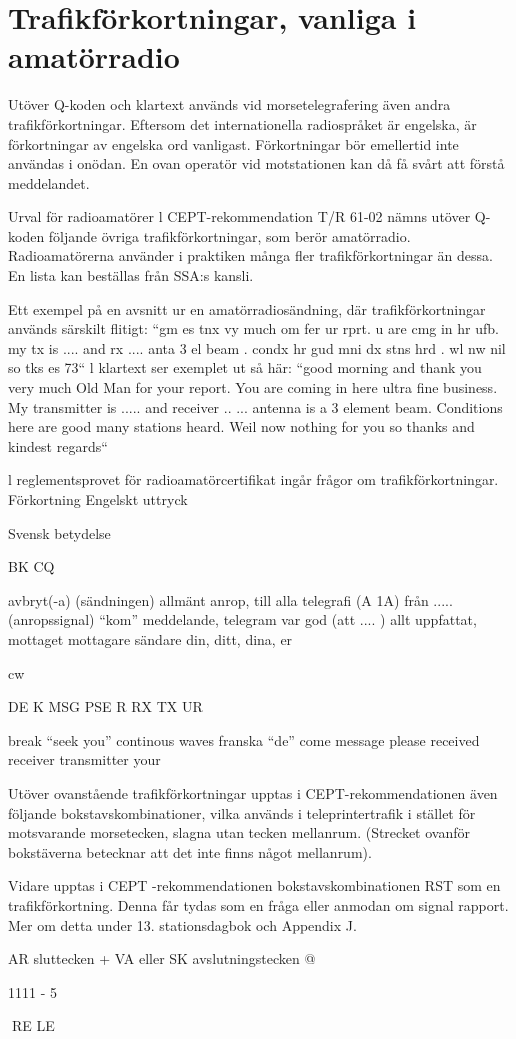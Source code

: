 \section{Trafikförkortningar, vanliga i amatörradio}
Utöver Q-koden och klartext används vid
morsetelegrafering även andra trafikförkortningar. Eftersom det internationella radiospråket är engelska, är förkortningar av engelska ord vanligast.
Förkortningar bör emellertid inte användas i onödan. En ovan operatör vid motstationen kan då få svårt att förstå meddelandet.

Urval för radioamatörer
l CEPT-rekommendation T/R 61-02 nämns
utöver Q-koden följande övriga trafikförkortningar, som berör amatörradio.
Radioamatörerna använder i praktiken
många fler trafikförkortningar än dessa. En
lista kan beställas från SSA:s kansli.

Ett exempel på en avsnitt ur en amatörradiosändning, där trafikförkortningar används
särskilt flitigt:
``gm es tnx vy much om fer ur rprt. u are
cmg in hr ufb. my tx is .... and rx .... anta 3
el beam . condx hr gud mni dx stns hrd . wl
nw nil so tks es 73``
l klartext ser exemplet ut så här:
``good morning and thank you very much
Old Man for your report. You are coming in
here ultra fine business. My transmitter is .....
and receiver .. ... antenna is a 3 element
beam. Conditions here are good many
stations heard. Weil now nothing for you so
thanks and kindest regards``

l reglementsprovet för radioamatörcertifikat ingår frågor om trafikförkortningar.
Förkortning Engelskt uttryck

Svensk betydelse

BK
CQ

avbryt(-a) (sändningen)
allmänt anrop, till alla
telegrafi (A 1A)
från ..... (anropssignal)
``kom''
meddelande, telegram
var god (att .... )
allt uppfattat, mottaget
mottagare
sändare
din, ditt, dina, er

cw

DE
K
MSG
PSE
R
RX
TX
UR

break
``seek you''
continous waves
franska ``de''
come
message
please
received
receiver
transmitter
your

Utöver ovanstående trafikförkortningar upptas i CEPT-rekommendationen även följande bokstavskombinationer, vilka används i
teleprintertrafik i stället för motsvarande
morsetecken, slagna utan tecken mellanrum.
(Strecket ovanför bokstäverna betecknar
att det inte finns något mellanrum).

Vidare upptas i CEPT -rekommendationen bokstavskombinationen RST som en
trafikförkortning. Denna får tydas som en
fråga eller anmodan om signal rapport.
Mer om detta under 13. stationsdagbok
och Appendix J.

AR
sluttecken
+
VA eller SK avslutningstecken @

1111 - 5

RE LE
